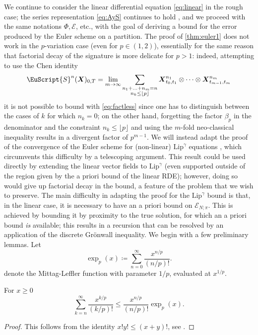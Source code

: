 \documentclass{article}
\newcommand{\bX}{\boldsymbol{X}}
\def\Sig{\EuScript{S}}
\def\p{{\lfloor p \rfloor}}
\def\cE{\mathcal{E}}
\numberwithin{equation}{section}
\theoremstyle{definition}
\theoremstyle{remark}
\begin{document}
We continue to consider the linear differential equation \eqref{eq:linear} in the rough case; the series representation \eqref{eq:AyS} continues to hold \cite[Theorem 4.5]{LCL}, and we proceed with the same notations $\Phi, \mathcal E$, etc., with the goal of deriving a bound for the error produced by the Euler scheme on a partition. The proof of \autoref{thm:euler1} does not work in the $p$-variation case (even for $p \in (1,2)$), essentially for the same reason that factorial decay of the signature is more delicate for $p > 1$: indeed, attempting to use the Chen identity
\[
\Sig^n(\bX)_{0,T} = \lim_{m \to \infty}\sum_{\substack{n_1 + \ldots + n_m = n \\ n_k \leq \p}} \bX^{n_1}_{t_0,t_1} \otimes \cdots \otimes \bX^{n_m}_{t_{m-1},t_m}
\]
it is not possible to bound with \eqref{eq:factless} since one has to distinguish between the cases of $k$ for which $n_k = 0$; on the other hand, forgetting the factor $\beta_p$ in the denominator and the constraint $n_k \leq \p$ and using the $m$-fold neo-classical inequality results in a divergent factor of $p^{m-1}$. We will instead adapt the proof of the convergence of the Euler scheme for (non-linear) $\mathrm{Lip}^\gamma$ equations \cite[Theorem 10.30]{FV10}, which circumvents this difficulty by a telescoping argument. This result could be used directly by extending the linear vector fields to $\mathrm{Lip}^\gamma$ (even supported outside of the region given by the a priori bound of the linear RDE); however, doing so would give up factorial decay in the bound, a feature of the problem that we wish to preserve. The main difficulty in adapting the proof for the $\mathrm{Lip}^\gamma$ bound is that, in the linear case, it is necessary to have an a priori bound on $\cE_{N;\pi}$. This is achieved by bounding it by proximity to the true solution, for which an a priori bound \emph{is} available; this results in a recursion that can be resolved by an application of the discrete Gr\"onwall inequality. We begin with a few preliminary lemmas. Let
\begin{equation}
\exp_p(x) \coloneqq \sum_{n = 0}^\infty \frac{x^{n/p}}{(n/p)!} .
\end{equation}
denote the Mittag-Leffler function with parameter $1/p$, evaluated at $x^{1/p}$.
\begin{lemma}
For $x \geq 0$
\[
\sum_{k = n}^\infty \frac{x^{k/p}}{(k/p)!} \leq \frac{x^{n/p}}{(n/p)!}\exp_p(x) .
\]
\end{lemma}
\begin{proof}
This follows from the identity $x!y! \leq (x+y)!$, see \cite[Lemma 4]{maud1}. 
\end{proof}
\end{document}
